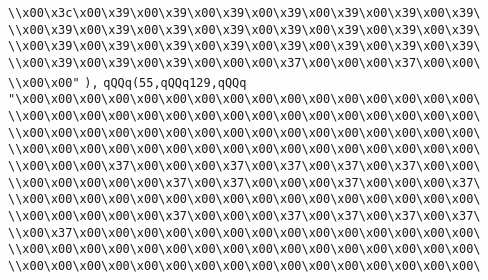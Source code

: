 \verb|\\x00\x3c\x00\x39\x00\x39\x00\x39\x00\x39\x00\x39\x00\x39\x00\x39\|\newline
\verb|\\x00\x39\x00\x39\x00\x39\x00\x39\x00\x39\x00\x39\x00\x39\x00\x39\|\newline
\verb|\\x00\x39\x00\x39\x00\x39\x00\x39\x00\x39\x00\x39\x00\x39\x00\x39\|\newline
\verb|\\x00\x39\x00\x39\x00\x39\x00\x00\x00\x37\x00\x00\x00\x37\x00\x00\|\newline
\verb|\\x00\x00"|\newline
\verb|),|\newline
\verb|qQQq(55,qQQq129,qQQq|\newline
\verb|"\x00\x00\x00\x00\x00\x00\x00\x00\x00\x00\x00\x00\x00\x00\x00\x00\|\newline
\verb|\\x00\x00\x00\x00\x00\x00\x00\x00\x00\x00\x00\x00\x00\x00\x00\x00\|\newline
\verb|\\x00\x00\x00\x00\x00\x00\x00\x00\x00\x00\x00\x00\x00\x00\x00\x00\|\newline
\verb|\\x00\x00\x00\x00\x00\x00\x00\x00\x00\x00\x00\x00\x00\x00\x00\x00\|\newline
\verb|\\x00\x00\x00\x37\x00\x00\x00\x37\x00\x37\x00\x37\x00\x37\x00\x00\|\newline
\verb|\\x00\x00\x00\x00\x00\x37\x00\x37\x00\x00\x00\x37\x00\x00\x00\x37\|\newline
\verb|\\x00\x00\x00\x00\x00\x00\x00\x00\x00\x00\x00\x00\x00\x00\x00\x00\|\newline
\verb|\\x00\x00\x00\x00\x00\x37\x00\x00\x00\x37\x00\x37\x00\x37\x00\x37\|\newline
\verb|\\x00\x37\x00\x00\x00\x00\x00\x00\x00\x00\x00\x00\x00\x00\x00\x00\|\newline
\verb|\\x00\x00\x00\x00\x00\x00\x00\x00\x00\x00\x00\x00\x00\x00\x00\x00\|\newline
\verb|\\x00\x00\x00\x00\x00\x00\x00\x00\x00\x00\x00\x00\x00\x00\x00\x00\|\newline
